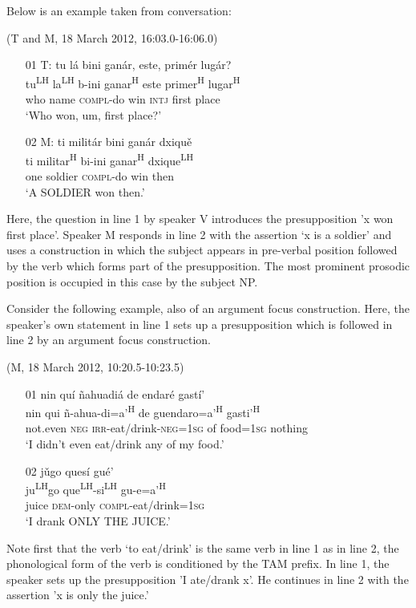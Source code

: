 Below is an example taken from conversation:

\ea(T and M, 18 March 2012, 16:03.0-16:06.0)
\begin{itemize}
\item[01 T:]
tu l\'{a} bini gan\'{a}r, este, prim\'{e}r lug\'{a}r? \\
tu\textsuperscript{LH} la\textsuperscript{LH} b-ini ganar\textsuperscript{H} este primer\textsuperscript{H} lugar\textsuperscript{H} \\
who name \textsc{compl}-do win \textsc{intj} first place  \\
\glt `Who won, um, first place?'


\item[02 M:]
\glll ti milit\'{a}r bini gan\'{a}r dxiqu\v{e} \\
ti militar\textsuperscript{H} bi-ini ganar\textsuperscript{H} dxique\textsuperscript{LH} \\
one soldier \textsc{compl}-do win then \\
\glt `A SOLDIER won then.' 


\end{itemize}
\z
Here, the question in line 1 by speaker V introduces the presupposition 'x won first place'. Speaker M responds in line 2 with the assertion `x is a soldier' and uses a construction in which the subject appears in pre-verbal position followed by the verb which forms part of the presupposition. The most prominent prosodic position is occupied in this case by the subject NP.

Consider the following example, also of an argument focus construction. Here, the speaker's own statement in line 1 sets up a presupposition which is followed in line 2 by an argument focus construction.  

\ea\label{jugoquesigue}(M, 18 March 2012, 10:20.5-10:23.5)
\begin{itemize}
\item [01]
\glll nin qu\'{i} \~{n}ahuadi\'{a} de endar\'{e} gast\'{i}' \\
nin qui \~{n}-ahua-di=a'\textsuperscript{H} de guendaro=a'\textsuperscript{H} gasti'\textsuperscript{H}  \\
not.even \textsc{neg} \textsc{irr}-eat/drink-\textsc{neg}=\textsc{1sg} of food=\textsc{1sg} nothing \\
\glt `I didn't even eat/drink any of my food.'


\item [02]
\glll j\v{u}go ques\'{i} gu\'{e}' \\
ju\textsuperscript{LH}go que\textsuperscript{LH}-si\textsuperscript{LH} gu-e=a'\textsuperscript{H} \\
juice \textsc{dem}-only \textsc{compl}-eat/drink=\textsc{1sg} \\
\glt `I drank ONLY THE JUICE.'  

\end{itemize}
\z
Note first that the verb `to eat/drink' is the same verb in line 1 as in line 2, the phonological form of the verb is conditioned by the TAM prefix. In line 1, the speaker sets up the presupposition 'I ate/drank x'. He continues in line 2 with the assertion 'x is only the juice.'  

